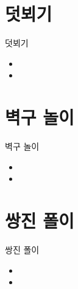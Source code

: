 \documentclass[aspectratio=1610,17pt,xcolor=pdftex,dvipsnames,table,handout]{beamer}
\begin{document}
		\section{ 덧뵈기 }

		\begin{frame} [t,plain]
			\begin{block} { 덧뵈기 }
			\begin{itemize}
				\item 
				\item 
			\end{itemize}
			\end{block}
		\end{frame}


		\section{ 벽구 놀이 }

		\begin{frame} [t,plain]
			\begin{block} { 벽구 놀이 }
			\begin{itemize}
				\item 
				\item 
			\end{itemize}
			\end{block}
		\end{frame}


		\section{ 쌍진 폴이 }

		\begin{frame} [t,plain]
			\begin{block} { 쌍진 폴이 }
			\begin{itemize}
				\item 
				\item 
			\end{itemize}
			\end{block}
		\end{frame}
\end{document}

